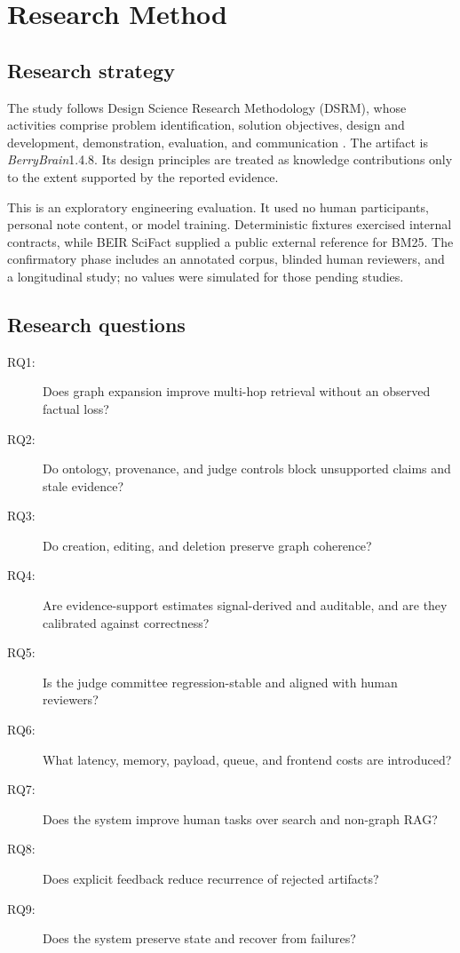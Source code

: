 \documentclass{sbc2023}
\newcommand{\BerryBrain}{\textit{BerryBrain}}
\begin{document}
\section{Research Method}
\label{sec:method}

\subsection{Research strategy}

The study follows Design Science Research Methodology (DSRM), whose activities comprise problem
identification, solution objectives, design and development, demonstration, evaluation, and
communication \cite{hevner2004design,peffers2007dsrm}. The artifact is \BerryBrain 1.4.8. Its
design principles are treated as knowledge contributions only to the extent supported by the
reported evidence.

This is an exploratory engineering evaluation. It used no human participants, personal note
content, or model training. Deterministic fixtures exercised internal contracts, while BEIR
SciFact supplied a public external reference for BM25. The confirmatory phase includes an
annotated corpus, blinded human reviewers, and a longitudinal study; no values were simulated for
those pending studies.

\subsection{Research questions}

\begin{description}
  \item[RQ1:] Does graph expansion improve multi-hop retrieval without an observed factual loss?
  \item[RQ2:] Do ontology, provenance, and judge controls block unsupported claims and stale evidence?
  \item[RQ3:] Do creation, editing, and deletion preserve graph coherence?
  \item[RQ4:] Are evidence-support estimates signal-derived and auditable, and are they calibrated against correctness?
  \item[RQ5:] Is the judge committee regression-stable and aligned with human reviewers?
  \item[RQ6:] What latency, memory, payload, queue, and frontend costs are introduced?
  \item[RQ7:] Does the system improve human tasks over search and non-graph RAG?
  \item[RQ8:] Does explicit feedback reduce recurrence of rejected artifacts?
  \item[RQ9:] Does the system preserve state and recover from failures?
\end{description}
\end{document}
